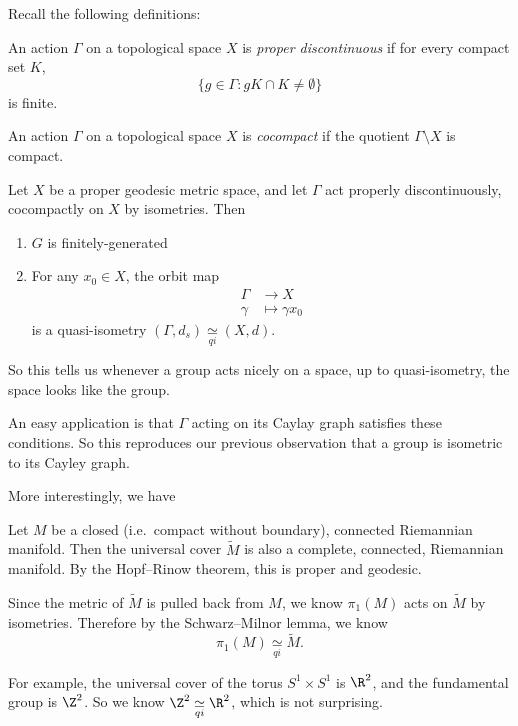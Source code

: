 \documentclass[a4paper]{article}
\newcommand{\qi}{\underset{qi}{\simeq}}
\begin{document}
Recall the following definitions:
\begin{defi}
  An action $\Gamma$ on a topological space $X$ is \emph{proper discontinuous} if for every compact set $K$,
  \[
    \{g \in \Gamma: gK \cap K \not= \emptyset\}
  \]
  is finite.
\end{defi}

\begin{defi}
  An action $\Gamma$ on a topological space $X$ is \emph{cocompact} if the quotient $\Gamma \setminus X$ is compact.
\end{defi}

\begin{lemma}
  Let $X$ be a proper geodesic metric space, and let $\Gamma$ act properly discontinuously, cocompactly on $X$ by isometries. Then
  \begin{enumerate}
    \item $G$ is finitely-generated
    \item For any $x_0 \in X$, the orbit map
      \begin{align*}
        \Gamma &\to X\\
        \gamma &\mapsto \gamma x_0
      \end{align*}
      is a quasi-isometry $(\Gamma, d_s) \qi (X, d)$.
  \end{enumerate}
\end{lemma}
So this tells us whenever a group acts nicely on a space, up to quasi-isometry, the space looks like the group. 

An easy application is that $\Gamma$ acting on its Caylay graph satisfies these conditions. So this reproduces our previous observation that a group is isometric to its Cayley graph.

More interestingly, we have
\begin{eg}
  Let $M$ be a closed (i.e.\ compact without boundary), connected Riemannian manifold. Then the universal cover $\tilde{M}$ is also a complete, connected, Riemannian manifold. By the Hopf--Rinow theorem, this is proper and geodesic.

  Since the metric of $\tilde{M}$ is pulled back from $M$, we know $\pi_1(M)$ acts on $\tilde{M}$ by isometries. Therefore by the Schwarz--Milnor lemma, we know
  \[
     \pi_1(M) \qi \tilde{M}.
  \]
\end{eg}
\begin{eg}
  For example, the universal cover of the torus $S^1 \times S^1$ is $\R^2$, and the fundamental group is $\Z^2$. So we know $\Z^2 \qi \R^2$, which is not surprising.
\end{eg}
\end{document}
